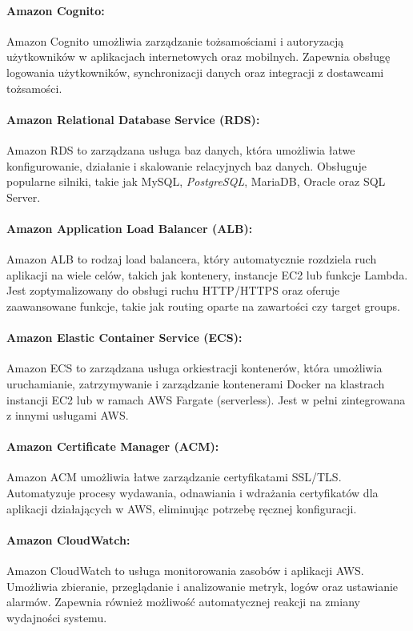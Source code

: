 \documentclass[../../main.tex]{subfiles}
\begin{document}
        \paragraph{Amazon Cognito:}
        Amazon Cognito umożliwia zarządzanie tożsamościami i autoryzacją użytkowników w aplikacjach internetowych oraz mobilnych. Zapewnia obsługę logowania użytkowników, synchronizacji danych oraz integracji z dostawcami tożsamości.
        
        \paragraph{Amazon Relational Database Service (RDS):}
        Amazon RDS to zarządzana usługa baz danych, która umożliwia łatwe konfigurowanie, działanie i skalowanie relacyjnych baz danych. Obsługuje popularne silniki, takie jak MySQL, \textit{PostgreSQL}, MariaDB, Oracle oraz SQL Server.
        
        \paragraph{Amazon Application Load Balancer (ALB):}
        Amazon ALB to rodzaj load balancera, który automatycznie rozdziela ruch aplikacji na wiele celów, takich jak kontenery, instancje EC2 lub funkcje Lambda. Jest zoptymalizowany do obsługi ruchu HTTP/HTTPS oraz oferuje zaawansowane funkcje, takie jak routing oparte na zawartości czy target groups.
        
        \paragraph{Amazon Elastic Container Service (ECS):}
        Amazon ECS to zarządzana usługa orkiestracji kontenerów, która umożliwia uruchamianie, zatrzymywanie i zarządzanie kontenerami Docker na klastrach instancji EC2 lub w ramach AWS Fargate (serverless). Jest w pełni zintegrowana z innymi usługami AWS.
        
        \paragraph{Amazon Certificate Manager (ACM):}
        Amazon ACM umożliwia łatwe zarządzanie certyfikatami SSL/TLS. Automatyzuje procesy wydawania, odnawiania i wdrażania certyfikatów dla aplikacji działających w AWS, eliminując potrzebę ręcznej konfiguracji.
        
        \paragraph{Amazon CloudWatch:}
        Amazon CloudWatch to usługa monitorowania zasobów i aplikacji AWS. Umożliwia zbieranie, przeglądanie i analizowanie metryk, logów oraz ustawianie alarmów. Zapewnia również możliwość automatycznej reakcji na zmiany wydajności systemu.
        
\end{document}
